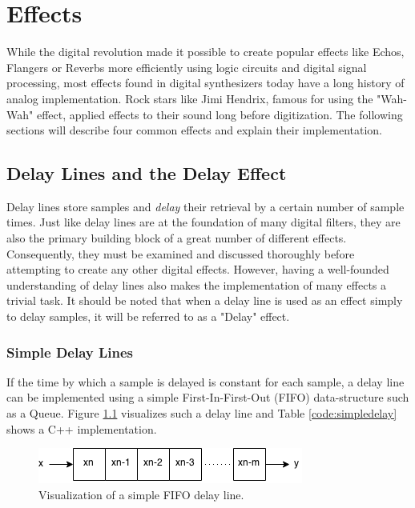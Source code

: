 \documentclass[12pt,twoside]{report}
\begin{document}


\chapter{Effects}

While the digital revolution made it possible to create popular effects like Echos, Flangers or Reverbs more efficiently using logic circuits and digital signal processing, most effects found in digital synthesizers today have a long history of analog implementation. Rock stars like Jimi Hendrix, famous for using the "Wah-Wah" effect, applied effects to their sound long before digitization. The following sections will describe four common effects and explain their implementation.

\section{Delay Lines and the Delay Effect}

Delay lines store samples and \emph{delay} their retrieval by a certain number of sample times. Just like delay lines are at the foundation of many digital filters, they are also the primary building block of a great number of different effects. Consequently, they must be examined and discussed thoroughly before attempting to create any other digital effects. However, having a well-founded understanding of delay lines also makes the implementation of many effects a trivial task. It should be noted that when a delay line is used as an effect simply to delay samples, it will be referred to as a "Delay" effect.

\subsection{Simple Delay Lines}

\noindent  If the time by which a sample is delayed is constant for each sample, a delay line can be implemented using a simple First-In-First-Out (FIFO) data-structure such as a Queue. Figure \ref{fig:simpledelay} visualizes such a delay line and Table \ref{code:simpledelay} shows a C++ implementation. 

\begin{figure}[h!]
  \includegraphics[scale=0.8]{img/simpledelay}
  \caption{Visualization of a simple FIFO delay line.}
  \label{fig:simpledelay}
\end{figure}
\end{document}
